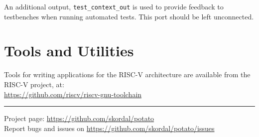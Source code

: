 \documentclass[10pt,a4paper]{article}
\begin{document}
\begin{minipage}[t]{0.48\textwidth}
An additional output, \texttt{test\_context\_out} is used to provide feedback to testbenches
when running automated tests. This port should be left unconnected.\\

\section{Tools and Utilities}

Tools for writing applications for the RISC-V architecture are available from the
RISC-V project, at:\\[1em]
\url{https://github.com/riscv/riscv-gnu-toolchain}\\

\end{minipage}

\vfill
\noindent\rule{\linewidth}{1pt}
{\small
Project page: \url{https://github.com/skordal/potato}\\
Report bugs and issues on \url{https://github.com/skordal/potato/issues}}
\end{document}
